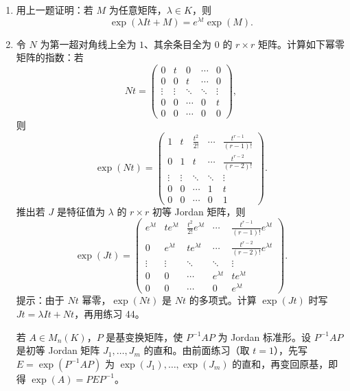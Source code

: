\begin{enumerate}[label=\arabic*.]
\item 用上一题证明：若 $M$ 为任意矩阵，$\lambda\in K$，则
\[
\exp(\lambda It+M)=e^{\lambda t}\exp(M).
\]

\item 令 $N$ 为第一超对角线上全为 $1$、其余条目全为 $0$ 的 $r\times r$ 矩阵。计算如下幂零矩阵的指数：若
\[
Nt=\begin{pmatrix}
0&t&0&\cdots&0\\
0&0&t&\cdots&0\\
\vdots&\vdots&\ddots&\ddots&\vdots\\
0&0&\cdots&0&t\\
0&0&\cdots&0&0
\end{pmatrix},
\]
则
\[
\exp(Nt)=
\begin{pmatrix}
1&t&\frac{t^2}{2!}&\cdots&\frac{t^{r-1}}{(r-1)!}\\
0&1&t&\cdots&\frac{t^{r-2}}{(r-2)!}\\
\vdots&\vdots&\ddots&\ddots&\vdots\\
0&0&\cdots&1&t\\
0&0&\cdots&0&1
\end{pmatrix}.
\]
推出若 $J$ 是特征值为 $\lambda$ 的 $r\times r$ 初等 Jordan 矩阵，则
\[
\exp(Jt)=
\begin{pmatrix}
 e^{\lambda t}&te^{\lambda t}&\frac{t^2}{2!}e^{\lambda t}&\cdots&\frac{t^{r-1}}{(r-1)!}e^{\lambda t}\\
0&e^{\lambda t}&te^{\lambda t}&\cdots&\frac{t^{r-2}}{(r-2)!}e^{\lambda t}\\
\vdots&\vdots&\ddots&\ddots&\vdots\\
0&0&\cdots&e^{\lambda t}&te^{\lambda t}\\
0&0&\cdots&0&e^{\lambda t}
\end{pmatrix}.
\]
提示：由于 $Nt$ 幂零，$\exp(Nt)$ 是 $Nt$ 的多项式。计算 $\exp(Jt)$ 时写 $Jt=\lambda It+Nt$，再用练习 44。

若 $A\in M_n(K)$，$P$ 是基变换矩阵，使 $P^{-1}AP$ 为 Jordan 标准形。设 $P^{-1}AP$ 是初等 Jordan 矩阵 $J_1,
\ldots,J_m$ 的直和。由前面练习（取 $t=1$），先写 $E=\exp(P^{-1}AP)$ 为 $\exp(J_1),
\ldots,
\exp(J_m)$ 的直和，再变回原基，即得 $\exp(A)=PEP^{-1}$。


\end{enumerate}
